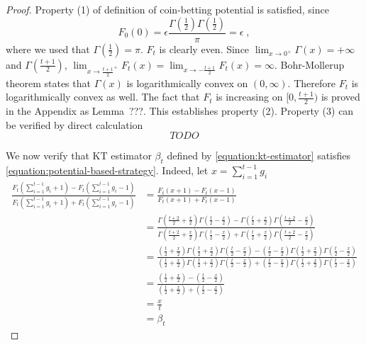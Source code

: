 \begin{proof}
Property (1) of definition of coin-betting potential is satisfied, since
$$
F_0(0) = \epsilon \frac{\Gamma(\frac{1}{2}) \Gamma(\frac{1}{2})}{\pi} = \epsilon \; ,
$$
where we used that $\Gamma(\frac{1}{2}) = \pi$. $F_t$ is clearly even.
Since $\lim_{x \to 0^+} \Gamma(x) = +\infty$ and $\Gamma(\frac{t+1}{2})$,
$\lim_{x \to \frac{t+1}{2}^+} F_t(x) = \lim_{x \to -\frac{t+1}{2}} F_t(x) = \infty$.
Bohr-Mollerup theorem states that $\Gamma(x)$ is logarithmically convex
on $(0,\infty)$. Therefore $F_t$ is logarithmically convex as well.
The fact that $F_t$ is increasing on $[0,\frac{t+1}{2})$ is proved
in the Appendix as Lemma~???. This establishes property (2).
Property (3) can be verified by direct calculation
$$
TODO
$$

We now verify that KT estimator $\beta_t$ defined by \eqref{equation:kt-estimator}
satisfies \eqref{equation:potential-based-strategy}. Indeed, let $x=\sum_{i=1}^{t-1} g_i$
\begin{align*}
\frac{F_t(\sum_{i=1}^{t-1} g_i + 1) - F_t(\sum_{i=1}^{t-1} g_i - 1)}{F_t(\sum_{i=1}^{t-1} g_i + 1) + F_t(\sum_{i=1}^{t-1} g_i - 1)}
& = \frac{F_t(x + 1) - F_t(x - 1)}{F_t(x + 1) + F_t(x - 1)} \\
& = \frac{\Gamma(\frac{t+2}{2} + \frac{x}{2}) \Gamma(\frac{t}{2} - \frac{x}{2}) - \Gamma(\frac{t}{2} + \frac{x}{2}) \Gamma(\frac{t+2}{2} - \frac{x}{2})}{\Gamma(\frac{t+2}{2} + \frac{x}{2}) \Gamma(\frac{t}{2} - \frac{x}{2}) + \Gamma(\frac{t}{2} + \frac{x}{2}) \Gamma(\frac{t+2}{2} - \frac{x}{2})} \\
& = \frac{(\frac{t}{2} + \frac{x}{2})\Gamma(\frac{t}{2} + \frac{x}{2}) \Gamma(\frac{t}{2} - \frac{x}{2}) - (\frac{t}{2} - \frac{x}{2})\Gamma(\frac{t}{2} + \frac{x}{2}) \Gamma(\frac{t}{2} - \frac{x}{2})}{(\frac{t}{2} + \frac{x}{2})\Gamma(\frac{t}{2} + \frac{x}{2}) \Gamma(\frac{t}{2} - \frac{x}{2}) + (\frac{t}{2} - \frac{x}{2})\Gamma(\frac{t}{2} + \frac{x}{2}) \Gamma(\frac{t}{2} - \frac{x}{2})} \\
& = \frac{(\frac{t}{2} + \frac{x}{2}) - (\frac{t}{2} - \frac{x}{2})}{(\frac{t}{2} + \frac{x}{2}) + (\frac{t}{2} - \frac{x}{2})} \\
& = \frac{x}{t} \\
& = \beta_t
\end{align*}
\end{proof}
